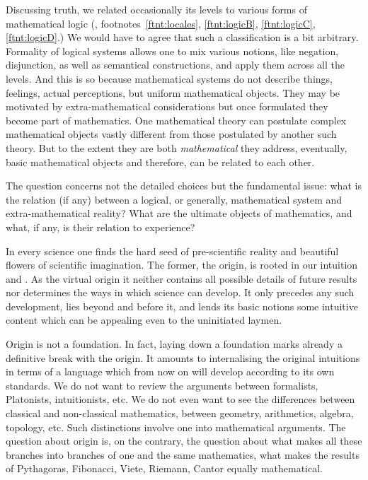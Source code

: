 Discussing truth, %
we related occasionally its levels to various forms of mathematical logic
(, footnotes~{\small{\ref{ftnt:locales}, \ref{ftnt:logicB},
\ref{ftnt:logicC}, \ref{ftnt:logicD}}}.) We
would have to agree that such a {classification} is a bit arbitrary.  Formality
of logical systems allows one to mix various
notions, like negation, disjunction, as well as semantical constructions, and
apply them across all the levels.  And this is so because mathematical systems
do not describe things, feelings, actual perceptions, but uniform mathematical
objects. They may be motivated by extra-mathematical considerations but once
formulated they become part of mathematics. One mathematical theory can
postulate complex mathematical objects vastly different from those
postulated by another such theory.
But to the extent they are both {\em mathematical} they address, eventually, basic
mathematical objects and therefore, can be related to each other.

The question concerns not the detailed choices but the fundamental issue: what
is the relation (if any) between a logical, or generally, mathematical system
and extra-mathematical reality?  What are the ultimate objects of mathematics,
and what, if any, is their relation to experience?



\pa
In every science one finds the hard seed of pre-scientific reality and 
beautiful flowers of scientific imagination. The former, the origin, 
is rooted in our intuition and . As the virtual origin it 
neither contains all possible details of future results nor 
determines the ways in which science can develop. It only precedes any 
such development, lies beyond and before it, and lends its basic notions 
some intuitive content which can be appealing even to the uninitiated 
laymen.%

Origin is not a foundation. In fact, laying down a foundation marks already a
definitive break with the origin. It amounts to internalising the original
intuitions in terms of a language which from now on will develop according to
its own standards. We do not want to review the arguments between formalists,
Platonists, intuitionists, etc. We do not even want to see the differences
between classical and non-classical mathematics, between geometry, arithmetics,
algebra, topology, etc. Such distinctions involve one into mathematical
arguments. The question about origin is, on the contrary, the question about
what makes all these branches into branches of one and the same mathematics,
what makes the results of Pythagoras, Fibonacci, Viete, Riemann, Cantor equally
mathematical.

